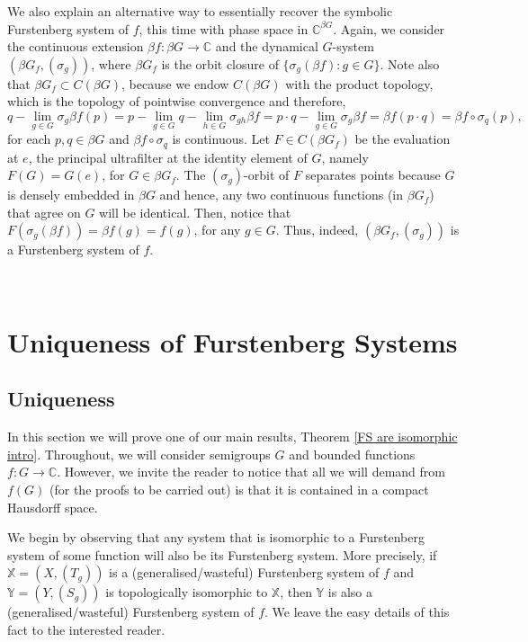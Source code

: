 \documentclass{amsart}
\numberwithin{equation}{section}
\theoremstyle{definition}
\theoremstyle{plain}
\newcommand{\C}{{\mathbb C}}
\begin{document}
We also explain an alternative way to essentially recover the symbolic Furstenberg 
system of $f$, this time with phase space in $\C^{\beta G}$.
Again, we consider the continuous extension $\beta f: \beta G\to \C$ and 
the dynamical $G$-system $(\beta G_f,(\sigma_g))$, where $\beta G_f$ is the 
orbit closure of $\{\sigma_g (\beta f): g\in G\}$. Note also that $\beta G_f \subset C(\beta G)$, because we endow $C(\beta G)$ with the product 
topology, which is the topology of pointwise convergence and therefore, $$q-\lim_{g\in G} \sigma_g \beta f(p)=p-\lim_{g\in G} q-\lim_{h\in G} \sigma_{gh} \beta f=p\cdot q-\lim_{g\in G}\sigma_g\beta f=\beta f(p \cdot q)=\beta f \circ \sigma_q (p),$$ for each $p,q\in \beta G$ and $\beta f \circ \sigma_q $ is continuous.  
Let $F\in C(\beta G_f)$ 
be the evaluation at $e$, the principal ultrafilter at the identity element 
of $G$, namely $F(G)=G(e)$, for $G\in \beta G_f$. The $(\sigma_g)$-orbit of 
$F$ separates points because $G$ is densely embedded in $\beta G$ and 
hence, any two continuous functions (in $\beta G_f$) that agree on $G$ will 
be identical. Then, notice that $F(\sigma_g (\beta f))=\beta f(g)=f(g)$, for
any $g\in G$. Thus, indeed, $(\beta G_f,(\sigma_g))$ is a Furstenberg 
system of $f$.



\
\section{Uniqueness of Furstenberg Systems} 
\label{sec:3}

\subsection{Uniqueness}\label{sec:3.1}

In this section we will prove one of our main results, Theorem
\ref{FS are isomorphic intro}. Throughout, we will consider semigroups $G$ 
and bounded functions $f:G\to \C$. However, we invite the reader to notice 
that all we will demand from $f(G)$ (for the proofs to be carried out) is
that it is contained 
in a compact Hausdorff space.

We begin by observing that any system that is
isomorphic to a Furstenberg system of some function will 
also be its Furstenberg system. More precisely, if 
$\mathbb{X}=(X,(T_g))$ is a 
(generalised/wasteful) Furstenberg system of $f$ and 
$\mathbb{Y}=(Y,(S_g))$ is topologically 
isomorphic to $\mathbb{X}$, then $\mathbb{Y}$ is also a 
(generalised/wasteful) Furstenberg system of $f$. We leave the easy details of this fact to the interested reader.
\end{document}
